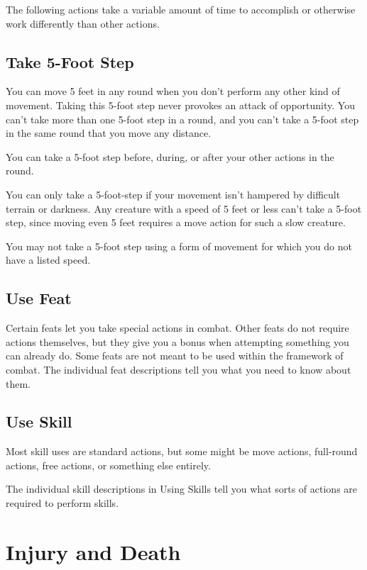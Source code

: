 				
The following actions take a variable amount of time to accomplish or otherwise work differently than other actions.
				
\subsection{Take 5-Foot Step}

				
You can move 5 feet in any round when you don't perform any other kind of movement. Taking this 5-foot step never provokes an attack of opportunity. You can't take more than one 5-foot step in a round, and you can't take a 5-foot step in the same round that you move any distance.
				
You can take a 5-foot step before, during, or after your other actions in the round. 
				
You can only take a 5-foot-step if your movement isn't hampered by difficult terrain or darkness. Any creature with a speed of 5 feet or less can't take a 5-foot step, since moving even 5 feet requires a move action for such a slow creature.
				
You may not take a 5-foot step using a form of movement for which you do not have a listed speed. 
				
\subsection{Use Feat}

				
Certain feats let you take special actions in combat. Other feats do not require actions themselves, but they give you a bonus when attempting something you can already do. Some feats are not meant to be used within the framework of combat. The individual feat descriptions tell you what you need to know about them.
				
\subsection{Use Skill}

				
Most skill uses are standard actions, but some might be move actions, full-round actions, free actions, or something else entirely.
				
The individual skill descriptions in Using Skills tell you what sorts of actions are required to perform skills.
				
\section{Injury and Death}

